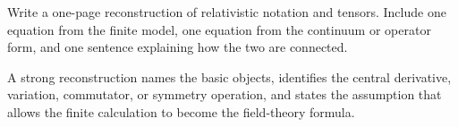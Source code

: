 \begin{exercise}
Write a one-page reconstruction of relativistic notation and tensors.  Include one equation from the finite model, one equation from the continuum or operator form, and one sentence explaining how the two are connected.
\begin{answer}
A strong reconstruction names the basic objects, identifies the central derivative, variation, commutator, or symmetry operation, and states the assumption that allows the finite calculation to become the field-theory formula.
\end{answer}
\end{exercise}
